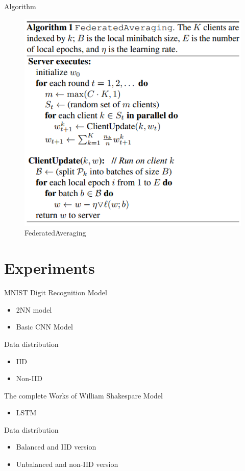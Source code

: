 \documentclass{beamer}
\begin{document}
\begin{frame}{Algorithm}

	\begin{figure}[htbp]
		\centering
		\includegraphics[scale=0.6]{alg.png}
		\caption{FederatedAveraging}
	\end{figure}
\end{frame}
\section{Experiments}
\begin{frame}{MNIST Digit Recognition}
	Model
	\begin{itemize}
		\item 2NN model\cite{lecun1998gradient}
		\item Basic CNN Model
	\end{itemize}
	Data distribution
	\begin{itemize}
		\item IID
		\item Non-IID
	\end{itemize}


\end{frame}
\begin{frame}{The complete Works of William Shakespare}
	Model
	\begin{itemize}
		\item LSTM\cite{kim2016character}
	\end{itemize}
	Data distribution
	\begin{itemize}
		\item Balanced and IID version
		\item Unbalanced and non-IID version
	\end{itemize}
\end{frame}
\end{document}
